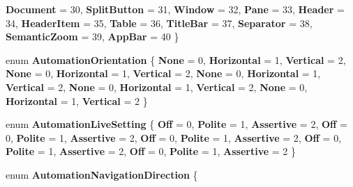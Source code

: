 \begin{DoxyCompactItemize}
{\bfseries Document} = 30, 
{\bfseries Split\+Button} = 31, 
\newline
{\bfseries Window} = 32, 
{\bfseries Pane} = 33, 
{\bfseries Header} = 34, 
{\bfseries Header\+Item} = 35, 
\newline
{\bfseries Table} = 36, 
{\bfseries Title\+Bar} = 37, 
{\bfseries Separator} = 38, 
{\bfseries Semantic\+Zoom} = 39, 
\newline
{\bfseries App\+Bar} = 40
 \}
\item 
\mbox{\label{namespace_windows_1_1_u_i_1_1_xaml_1_1_automation_1_1_peers_a7279523ced8212af46486c324a89ee2b}} 
enum {\bfseries Automation\+Orientation} \{ \newline
{\bfseries None} = 0, 
{\bfseries Horizontal} = 1, 
{\bfseries Vertical} = 2, 
{\bfseries None} = 0, 
\newline
{\bfseries Horizontal} = 1, 
{\bfseries Vertical} = 2, 
{\bfseries None} = 0, 
{\bfseries Horizontal} = 1, 
\newline
{\bfseries Vertical} = 2, 
{\bfseries None} = 0, 
{\bfseries Horizontal} = 1, 
{\bfseries Vertical} = 2, 
\newline
{\bfseries None} = 0, 
{\bfseries Horizontal} = 1, 
{\bfseries Vertical} = 2
 \}
\item 
\mbox{\label{namespace_windows_1_1_u_i_1_1_xaml_1_1_automation_1_1_peers_a3a01b3ce21eb110af096e897e16e1c78}} 
enum {\bfseries Automation\+Live\+Setting} \{ \newline
{\bfseries Off} = 0, 
{\bfseries Polite} = 1, 
{\bfseries Assertive} = 2, 
{\bfseries Off} = 0, 
\newline
{\bfseries Polite} = 1, 
{\bfseries Assertive} = 2, 
{\bfseries Off} = 0, 
{\bfseries Polite} = 1, 
\newline
{\bfseries Assertive} = 2, 
{\bfseries Off} = 0, 
{\bfseries Polite} = 1, 
{\bfseries Assertive} = 2, 
\newline
{\bfseries Off} = 0, 
{\bfseries Polite} = 1, 
{\bfseries Assertive} = 2
 \}
\item 
\mbox{\label{namespace_windows_1_1_u_i_1_1_xaml_1_1_automation_1_1_peers_a9b8626451e301972334ca5697b978934}} 
enum {\bfseries Automation\+Navigation\+Direction} \{ \newline

\end{DoxyCompactItemize}

